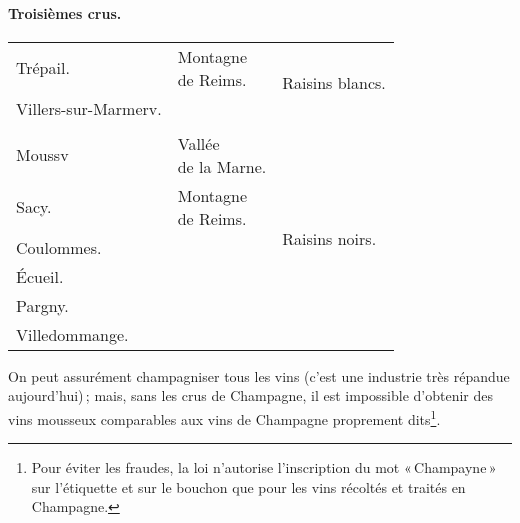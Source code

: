 \paragraph{ Troisièmes crus.}

\scriptsize
\begin{longtable}{m{10em}m{12em}m{12em}}                                                    
  Trépail.                 & \makecell{Montagne 
                             \\ de Reims.}               & \multirow{2}{12em}{Raisins blancs.}                         \\
  Villers-sur-Marmerv.     & \makecell{—}                &                                                             \\
                           &                             &                                                             \\
  Moussv                   & \makecell{Vallée 
                             \\de la Marne.}             & \multirow{6}{12em}{Raisins noirs.}                          \\
  Sacy.                    & \makecell{Montagne 
                             \\ de Reims.}               &                                                             \\
  Coulommes.               & \makecell{—}                &                                                             \\
  Écueil.                  & \makecell{—}                &                                                             \\
  Pargny.                  & \makecell{—}                &                                                             \\
  Villedommange.           & \makecell{—}                &                                                             \\
\end{longtable}
\normalsize

On peut assurément champagniser tous les vins (c'est une industrie très
répandue aujourd'hui) ; mais, sans les crus de Champagne, il est impossible
d'obtenir des vins mousseux comparables aux vins de Champagne proprement
dits\footnote{ Pour éviter les fraudes, la loi n'autorise l'inscription du mot
« Champayne » sur l'étiquette et sur le bouchon que pour les vins récoltés et
traités en Champagne.}.

